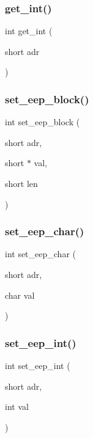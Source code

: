 \mbox{\label{eep_8h_a5bedcc8c4c37b17b48b2819aaeadc7f8}} 
\subsubsection{get\+\_\+int()}
{\footnotesize\ttfamily int get\+\_\+int (\begin{DoxyParamCaption}\item[{short}]{adr }\end{DoxyParamCaption})}

\mbox{\label{eep_8h_a9747828b594ce14b24b9ea1c54e9b770}} 
\subsubsection{set\+\_\+eep\+\_\+block()}
{\footnotesize\ttfamily int set\+\_\+eep\+\_\+block (\begin{DoxyParamCaption}\item[{short}]{adr,  }\item[{short $\ast$}]{val,  }\item[{short}]{len }\end{DoxyParamCaption})}

\mbox{\label{eep_8h_a112b9b4b470b9d4d06d60b4694aa82be}} 
\subsubsection{set\+\_\+eep\+\_\+char()}
{\footnotesize\ttfamily int set\+\_\+eep\+\_\+char (\begin{DoxyParamCaption}\item[{short}]{adr,  }\item[{char}]{val }\end{DoxyParamCaption})}

\mbox{\label{eep_8h_a530e265f0fd104b509c41cfaedfa692c}} 
\subsubsection{set\+\_\+eep\+\_\+int()}
{\footnotesize\ttfamily int set\+\_\+eep\+\_\+int (\begin{DoxyParamCaption}\item[{short}]{adr,  }\item[{int}]{val }\end{DoxyParamCaption})}


